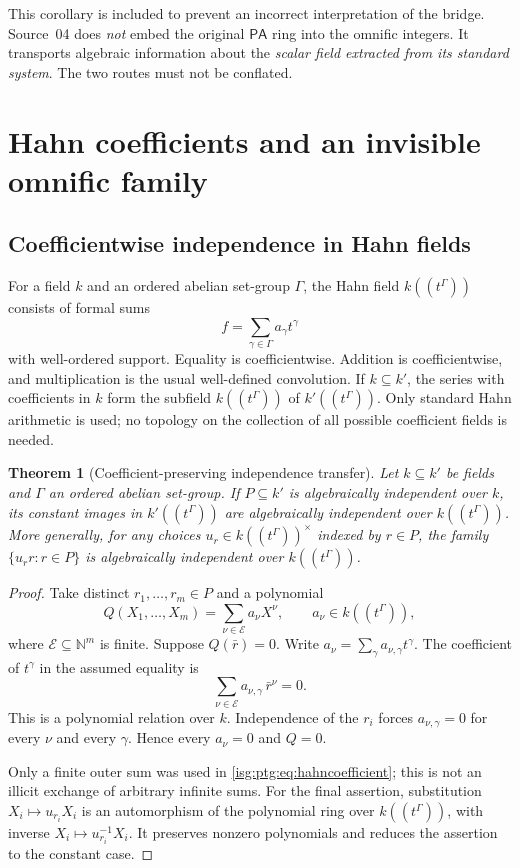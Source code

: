\documentclass[11pt]{article}
\newtheorem{theorem}{Theorem}[section]
\theoremstyle{definition}
\theoremstyle{remark}
\newcommand{\N}{\mathbb{N}}
\newcommand{\PA}{\mathsf{PA}}
\begin{document}
This corollary is included to prevent an incorrect interpretation of the
bridge. Source~04 does \emph{not} embed the original $\PA$ ring into the
omnific integers. It transports algebraic information about the
\emph{scalar field extracted from its standard system}. The two routes must
not be conflated.

\section{Hahn coefficients and an invisible omnific family}\label{isg:ptg:sec:hahn}

\subsection{Coefficientwise independence in Hahn fields}
For a field $k$ and an ordered abelian set-group $\Gamma$, the Hahn field
$k((t^\Gamma))$ consists of formal sums
\[
 f=\sum_{\gamma\in\Gamma}a_\gamma t^\gamma
\]
with well-ordered support. Equality is coefficientwise. Addition is
coefficientwise, and multiplication is the usual well-defined convolution.
If $k\subseteq k'$, the series with coefficients in $k$ form the subfield
$k((t^\Gamma))$ of $k'((t^\Gamma))$. Only standard Hahn arithmetic is used;
no topology on the collection of all possible coefficient fields is needed.

\begin{theorem}[Coefficient-preserving independence transfer]\label{isg:ptg:thm:hahn}
Let $k\subseteq k'$ be fields and $\Gamma$ an ordered abelian set-group. If
$P\subseteq k'$ is algebraically independent over $k$, its constant images
in $k'((t^\Gamma))$ are algebraically independent over $k((t^\Gamma))$.
More generally, for any choices $u_r\in k((t^\Gamma))^\times$ indexed by
$r\in P$, the family $\{u_rr:r\in P\}$ is algebraically independent over
$k((t^\Gamma))$.
\end{theorem}
\begin{proof}
Take distinct $r_1,\ldots,r_m\in P$ and a polynomial
\[
 Q(X_1,\ldots,X_m)=\sum_{\nu\in\mathcal E}a_\nu X^\nu,
 \qquad a_\nu\in k((t^\Gamma)),
\]
where $\mathcal E\subseteq\N^m$ is finite. Suppose $Q(\bar r)=0$. Write
$a_\nu=\sum_\gamma a_{\nu,\gamma}t^\gamma$. The coefficient of $t^\gamma$
in the assumed equality is
\begin{equation}\label{isg:ptg:eq:hahncoefficient}
 \sum_{\nu\in\mathcal E}a_{\nu,\gamma}\,\bar r^{\nu}=0.
\end{equation}
This is a polynomial relation over $k$. Independence of the $r_i$ forces
$a_{\nu,\gamma}=0$ for every $\nu$ and every $\gamma$. Hence every
$a_\nu=0$ and $Q=0$.

Only a finite outer sum was used in \eqref{isg:ptg:eq:hahncoefficient};
this is not an illicit exchange of arbitrary infinite sums. For the final
assertion, substitution $X_i\mapsto u_{r_i}X_i$ is an automorphism of the
polynomial ring over $k((t^\Gamma))$, with inverse
$X_i\mapsto u_{r_i}^{-1}X_i$. It preserves nonzero polynomials and reduces
the assertion to the constant case.
\end{proof}
\end{document}
